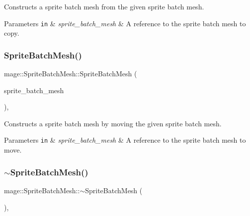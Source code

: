 Constructs a sprite batch mesh from the given sprite batch mesh.


\begin{DoxyParams}[1]{Parameters}
\mbox{\tt in}  & {\em sprite\+\_\+batch\+\_\+mesh} & A reference to the sprite batch mesh to copy. \\
\hline
\end{DoxyParams}
\hypertarget{classmage_1_1_sprite_batch_mesh_aaeec56215da80e9f0fdcb0323acd5f90}{}\label{classmage_1_1_sprite_batch_mesh_aaeec56215da80e9f0fdcb0323acd5f90} 
\subsubsection{\texorpdfstring{Sprite\+Batch\+Mesh()}{SpriteBatchMesh()}\hspace{0.1cm}{\footnotesize\ttfamily [4/4]}}
{\footnotesize\ttfamily mage\+::\+Sprite\+Batch\+Mesh\+::\+Sprite\+Batch\+Mesh (\begin{DoxyParamCaption}\item[{\hyperlink{classmage_1_1_sprite_batch_mesh}{Sprite\+Batch\+Mesh} \&\&}]{sprite\+\_\+batch\+\_\+mesh }\end{DoxyParamCaption})\hspace{0.3cm}{\ttfamily [default]}, {\ttfamily [noexcept]}}

Constructs a sprite batch mesh by moving the given sprite batch mesh.


\begin{DoxyParams}[1]{Parameters}
\mbox{\tt in}  & {\em sprite\+\_\+batch\+\_\+mesh} & A reference to the sprite batch mesh to move. \\
\hline
\end{DoxyParams}
\hypertarget{classmage_1_1_sprite_batch_mesh_a4f9ad5d0d58722499b9e7ddfac3312c9}{}\label{classmage_1_1_sprite_batch_mesh_a4f9ad5d0d58722499b9e7ddfac3312c9} 
\subsubsection{\texorpdfstring{$\sim$\+Sprite\+Batch\+Mesh()}{~SpriteBatchMesh()}}
{\footnotesize\ttfamily mage\+::\+Sprite\+Batch\+Mesh\+::$\sim$\+Sprite\+Batch\+Mesh (\begin{DoxyParamCaption}{ }\end{DoxyParamCaption})\hspace{0.3cm}{\ttfamily [virtual]}, {\ttfamily [default]}}

